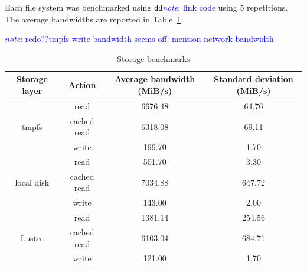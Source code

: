 \documentclass{report}
\newcommand{\note}[1]{\textcolor{blue}{\textit{note}: #1}}
\begin{document}
    Each file system was benchmarked using \texttt{dd}\note{link code} using 5 repetitions. The average bandwidths are
    reported in Table~\ref{table:fs}

    \note{redo??tmpfs write bandwidth seems off. mention network bandwidth}
    \begin{table}
    \centering
    \begin{tabular}{@{}|c|c|c|c|@{}} 
     \hline
     Storage layer & Action & Average bandwidth (MiB/s) & Standard deviation (MiB/s) \\
     \hline
     \multirow{3}{*}{tmpfs} & read & 6676.48 & 64.76 \\
     & cached read & 6318.08 & 69.11 \\
     & write & 199.70 & 1.70 \\
     \hline
     \multirow{3}{*}{local disk} & read & 501.70 & 3.30 \\
     & cached read & 7034.88 & 647.72 \\
     & write & 143.00 & 2.00 \\
     \hline
     \multirow{3}{*}{Lustre} & read & 1381.14 & 254.56 \\
     & cached read & 6103.04 & 684.71 \\
     & write & 121.00 & 1.70 \\

     \hline

    \end{tabular}
    \caption{Storage benchmarks}
    \label{table:fs}
    \end{table}




    
\end{document}

